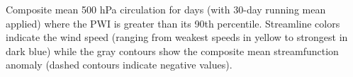 \label{fig:pwi_spatial_summary}
Composite mean 500 hPa circulation for days (with 30-day running mean applied) where the PWI is greater than its 90th percentile. Streamline colors indicate the wind speed (ranging from weakest speeds in yellow to strongest in dark blue) while the gray contours show the composite mean streamfunction anomaly (dashed contours indicate negative values). 
